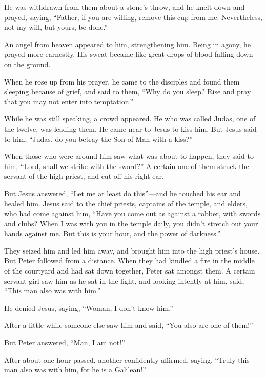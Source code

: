  He was withdrawn from them about a stone's throw, and he
knelt down and prayed,  saying, ``Father, if you are
willing, remove this cup from me. Nevertheless, not my will, but yours,
be done.''

 An angel from heaven appeared to him, strengthening him.
 Being in agony, he prayed more earnestly. His sweat became
like great drops of blood falling down on the ground.

 When he rose up from his prayer, he came to the disciples
and found them sleeping because of grief,  and said to
them, ``Why do you sleep? Rise and pray that you may not enter into
temptation.''

 While he was still speaking, a crowd appeared. He who was
called Judas, one of the twelve, was leading them. He came near to Jesus
to kiss him.  But Jesus said to him, ``Judas, do you betray
the Son of Man with a kiss?''

 When those who were around him saw what was about to
happen, they said to him, ``Lord, shall we strike with the sword?''
 A certain one of them struck the servant of the high
priest, and cut off his right ear.

 But Jesus answered, ``Let me at least do this''---and he
touched his ear and healed him.  Jesus said to the chief
priests, captains of the temple, and elders, who had come against him,
``Have you come out as against a robber, with swords and clubs?
 When I was with you in the temple daily, you didn't
stretch out your hands against me. But this is your hour, and the power
of darkness.''

 They seized him and led him away, and brought him into the
high priest's house. But Peter followed from a distance. 
When they had kindled a fire in the middle of the courtyard and had sat
down together, Peter sat amongst them.  A certain servant
girl saw him as he sat in the light, and looking intently at him, said,
``This man also was with him.''

 He denied Jesus, saying, ``Woman, I don't know him.''

 After a little while someone else saw him and said, ``You
also are one of them!''

But Peter answered, ``Man, I am not!''

 After about one hour passed, another confidently affirmed,
saying, ``Truly this man also was with him, for he is a Galilean!''

